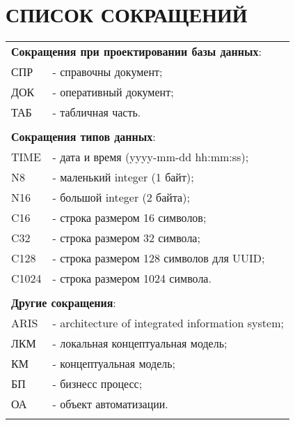 {}
\section*{СПИСОК СОКРАЩЕНИЙ}

\begin{tabular}{ll}
    \multicolumn{2}{l}{\textbf{Сокращения при проектировании базы данных}:}\\
    СПР  & - справочны документ; \\
    ДОК  & - оперативный документ; \\
    ТАБ  & - табличная часть. \\
    &\\
    \multicolumn{2}{l}{\textbf{Сокращения типов данных}:}\\
    TIME & - дата и время (yyyy-mm-dd hh:mm:ss); \\
    N8   & - маленький integer (1 байт); \\
    N16  & - большой integer (2 байта); \\
    C16  & - строка размером 16 символов; \\
    C32  & - строка размером 32 символа; \\
    C128 & - строка размером 128 символов для UUID; \\
    C1024  & - строка размером 1024 символа. \\
    &\\
    \multicolumn{2}{l}{\textbf{Другие сокращения}:}\\
    ARIS & - architecture of integrated information system;\\
    ЛКМ  & - локальная концептуальная модель;\\ 
    КМ   & - концептуальная модель;\\
    БП   & - бизнесс процесс;\\
    ОА   & - объект автоматизации.\\
    &\\
\end{tabular}

\newpage
